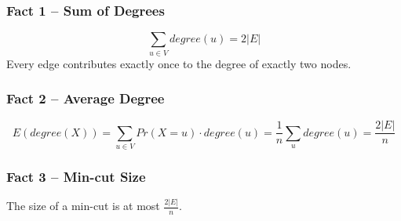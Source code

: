 \begin{frame}
  \frametitle{Fact 1 -- Sum of Degrees}
{ \Huge
  \[
    \sum_{u\in V} degree(u) = 2|E|
  \]
}  
  Every edge contributes exactly once to the degree of exactly two nodes.
\end{frame}

\begin{frame}
  \frametitle{Fact 2 -- Average Degree}
  \[
    E(degree(X)) = \sum_{u\in V} Pr(X=u)\cdot degree(u) = \frac{1}{n} \sum_u degree(u) = \frac{2|E|}{n}
  \]
\end{frame}

\begin{frame}
  \frametitle{Fact 3 -- Min-cut Size}
  
  The size of a min-cut is at most $\frac{2|E|}{n}$.
  
  
\end{frame}

